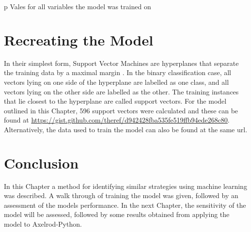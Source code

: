 \begin{table}[htbp!]
    \centering
    
    \caption{p Vales for all variables the model was trained on}
    \label{tab:pvalues}
\end{table}



\section{Recreating the Model}

In their simplest form, Support Vector Machines are hyperplanes that separate the training data by a maximal margin \cite{Tong2001, Cortes1995}.
In the binary classification case, all vectors lying on one side of the hyperplane are labelled as one class, and all vectors lying on the other side are labelled as the other.
The training instances that lie closest to the hyperplane are called support vectors.
For the model outlined in this Chapter, 596 support vectors were calculated and these can be found at \url{https://gist.github.com/theref/d942428fba535fe519ffb94ede268c80}.
Alternatively, the data used to train the model can also be found at the same url.



\section{Conclusion}

In this Chapter a method for identifying similar strategies using machine learning was described.
A walk through of training the model was given, followed by an assessment of the models performance.
In the next Chapter, the sensitivity of the model will be assessed, followed by some results obtained from applying the model to Axelrod-Python.
